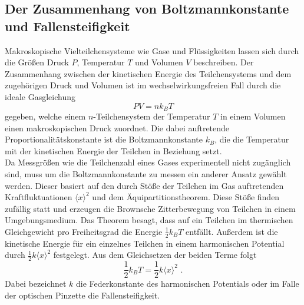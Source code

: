\subsection{Der Zusammenhang von Boltzmannkonstante und Fallensteifigkeit}
Makroskopische Vielteilchensysteme wie Gase und Flüssigkeiten lassen sich durch die Größen Druck $P$, Temperatur $T$ und Volumen $V$ beschreiben.
Der Zusammenhang zwischen der kinetischen Energie des Teilchensystems und dem zugehörigen Druck und Volumen ist im wechselwirkungsfreien Fall durch die ideale Gasgleichung
\begin{equation}
  PV = n k_B T
\end{equation}
gegeben, welche einem $n$-Teilchensystem der Temperatur $T$ in einem Volumen einen makroskopischen Druck zuordnet.
Die dabei auftretende Proportionalitätskonstante ist die Boltzmannkonstante $k_B$, die die Temperatur mit der kinetischen Energie der Teilchen in Beziehung setzt.\\
Da Messgrößen wie die Teilchenzahl eines Gases experimentell nicht zugänglich sind, muss um die Boltzmannkonstante zu messen ein anderer Ansatz gewählt werden. Dieser basiert auf den durch Stöße der Teilchen im Gas auftretenden Kraftfluktuationen $\langle x \rangle ^2$ und dem Äquipartitionstheorem. Diese Stöße finden zufällig statt und erzeugen die Brownsche Zitterbewegung von Teilchen in einem Umgebungsmedium. Das Theorem besagt, dass auf ein Teilchen im thermischen Gleichgewicht pro Freiheitsgrad die Energie $\frac{1}{2}k_B T$ entfällt. Außerdem ist die kinetische Energie für ein einzelnes Teilchen in einem harmonischen Potential durch $\frac{1}{2} k \langle x \rangle^2$ festgelegt. Aus dem Gleichsetzen der beiden Terme
folgt
\begin{equation}
  \frac{1}{2}k_B T = \frac{1}{2} k \langle x \rangle^2 \,\,.
\end{equation}
Dabei bezeichnet $k$ die Federkonstante des harmonischen Potentials oder im Falle der optischen Pinzette die Fallensteifigkeit. \cite{anleitung}\\

